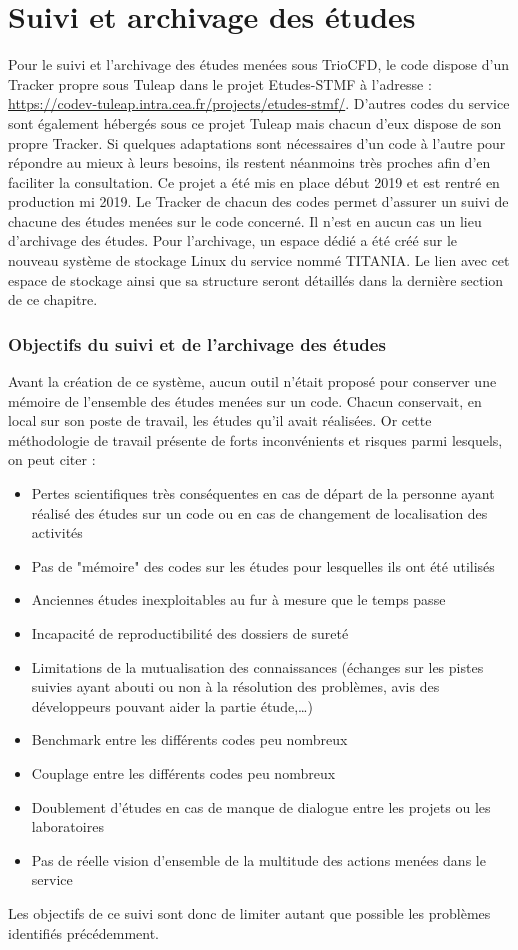 \newpage
\chapter{Suivi et archivage des études}
Pour le suivi et l'archivage des études menées sous TrioCFD, le code dispose d'un Tracker propre sous Tuleap dans le projet Etudes-STMF à l'adresse : \url{https://codev-tuleap.intra.cea.fr/projects/etudes-stmf/}. D'autres codes du service sont également hébergés sous ce projet Tuleap mais chacun d'eux dispose de son propre Tracker. Si quelques adaptations sont nécessaires d'un code à l'autre pour répondre au mieux à leurs besoins, ils restent néanmoins très proches afin d'en faciliter la consultation. Ce projet a été mis en place début 2019 et est rentré en production mi 2019. Le Tracker de chacun des codes permet d'assurer un suivi de chacune des études menées sur le code concerné. Il n'est en aucun cas un lieu d'archivage des études. Pour l'archivage, un espace dédié a été créé sur le nouveau système de stockage Linux du service nommé TITANIA. Le lien avec cet espace de stockage ainsi que sa structure seront détaillés dans la dernière section de ce chapitre.
\subsection{Objectifs du suivi et de l'archivage des études}
Avant la création de ce système, aucun outil n'était proposé pour conserver une mémoire de l'ensemble des études menées sur un code. Chacun conservait, en local sur son poste de travail, les études qu'il avait réalisées. Or cette méthodologie de travail présente de forts inconvénients et risques parmi lesquels, on peut citer : 
\begin{itemize}
   \item Pertes scientifiques très conséquentes en cas de départ de la personne ayant réalisé des études sur un code ou en cas de changement de localisation des activités
   \item Pas de "mémoire" des codes sur les études pour lesquelles ils ont été utilisés
   \item Anciennes études inexploitables au fur à mesure que le temps passe
   \item Incapacité de reproductibilité des dossiers de sureté
   \item Limitations de la mutualisation des connaissances (échanges sur les pistes suivies ayant abouti ou non à la résolution des problèmes, avis des développeurs pouvant aider la partie étude,…)
   \item Benchmark entre les différents codes peu nombreux
   \item Couplage entre les différents codes peu nombreux
   \item Doublement d'études en cas de manque de dialogue entre les projets ou les laboratoires
   \item Pas de réelle vision d'ensemble de la multitude des actions menées dans le service
\end{itemize}
Les objectifs de ce suivi sont donc de limiter autant que possible les problèmes identifiés précédemment.

